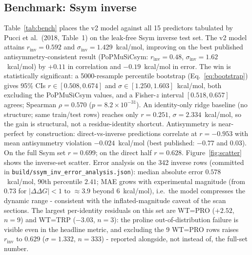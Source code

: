 \documentclass[11pt]{article}
\begin{document}
\subsection{Benchmark: Ssym inverse}
Table~\ref{tab:bench} places the v2 model against all 15 predictors
tabulated by Pucci et al.\ (2018, Table~1) on the leak-free Ssym inverse
test set. The v2 model attains $r_{\mathrm{inv}}=0.592$ and
$\sigma_{\mathrm{inv}}=1.429$~kcal/mol, improving on the best published
antisymmetry-consistent result (PoPMuSiCsym: $r_{\mathrm{inv}}=0.48$,
$\sigma_{\mathrm{inv}}=1.62$~kcal/mol) by $+0.11$ in correlation and
$-0.19$~kcal/mol in error. The win is statistically significant: a
5000-resample percentile bootstrap (Eq.~\eqref{eq:bootstrap}) gives
95\% CIs $r\in[0.508,0.674]$ and $\sigma\in[1.250,1.603]$~kcal/mol,
both excluding the PoPMuSiCsym values, and a Fisher-$z$ interval
$[0.518,0.657]$ agrees; Spearman $\rho=0.570$
($p=8.2\times10^{-31}$). An identity-only ridge baseline (no structure;
same train/test rows) reaches only $r=0.251$,
$\sigma=2.334$~kcal/mol, so the gain is structural, not a residue-identity
shortcut. Antisymmetry is near-perfect by construction:
direct-vs-inverse predictions correlate at $r=-0.953$ with mean
antisymmetry violation $-0.024$~kcal/mol (best published: $-0.77$ and
$0.03$). On the full Ssym set $r=0.699$; on the direct half $r=0.628$.
Figure~\ref{fig:scatter} shows the inverse-set scatter. Error
analysis on the 342 inverse rows (committed in
\texttt{build/ssym\_inv\_error\_analysis.json}): median absolute
error $0.578$~kcal/mol, 90th percentile $2.41$; MAE grows with
experimental magnitude (from $0.73$ for $|\Delta\Delta G|<1$ to
$\approx3.9$ beyond $6$~kcal/mol), i.e.\ the model compresses the
dynamic range - consistent with the inflated-magnitude caveat of the
scan sections. The largest per-identity residuals on this set are
WT=PRO ($+2.52$, $n=9$) and WT=TRP ($-3.03$, $n=3$): the proline
out-of-distribution failure is visible even in the headline metric,
and excluding the 9 WT=PRO rows raises $r_{\mathrm{inv}}$ to
$0.629$ ($\sigma=1.332$, $n=333$) - reported alongside, not instead
of, the full-set number.
\end{document}
